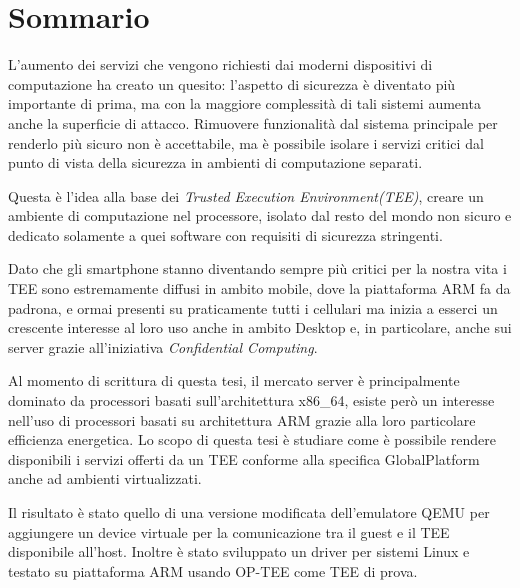 \documentclass[12pt,italian]{report}
\begin{document}
\frontespizio
\afterpreface

\chapter*{Sommario}
\label{cap:sommario}

L'aumento dei servizi che vengono richiesti dai moderni dispositivi di
computazione ha creato un quesito: l'aspetto di sicurezza è diventato più
importante di prima, ma con la maggiore complessità di tali sistemi aumenta
anche la superficie di attacco.
Rimuovere funzionalità dal sistema principale per renderlo più sicuro non
è accettabile, ma è possibile isolare i servizi critici dal punto di vista
della sicurezza in ambienti di computazione separati.

Questa è l'idea alla base dei \textit{Trusted Execution Environment(TEE)},
creare un ambiente di computazione nel processore, isolato dal resto del
mondo non sicuro e dedicato solamente a quei software con requisiti di
sicurezza stringenti.

Dato che gli smartphone stanno diventando sempre più critici per la nostra vita
i TEE sono estremamente diffusi in ambito mobile, dove la piattaforma ARM fa da
padrona, e ormai presenti su praticamente tutti i cellulari ma inizia a esserci
un crescente interesse al loro uso anche in ambito Desktop e, in particolare,
anche sui server grazie all'iniziativa \textit{Confidential Computing}.

Al momento di scrittura di questa tesi, il mercato server è principalmente
dominato da processori basati sull'architettura x86\_64, esiste però un
interesse nell'uso di processori basati su architettura ARM grazie alla loro
particolare efficienza energetica.
Lo scopo di questa tesi è studiare come è possibile rendere disponibili i
servizi offerti da un TEE conforme alla specifica GlobalPlatform anche ad
ambienti virtualizzati.

Il risultato è stato quello di una versione modificata dell'emulatore QEMU
per aggiungere un device virtuale per la comunicazione tra il guest e il TEE
disponibile all'host. Inoltre è stato sviluppato un driver per sistemi Linux
e testato su piattaforma ARM usando OP-TEE come TEE di prova.
\end{document}
